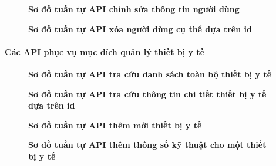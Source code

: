 \begin{figure}[H]
	\centering
	\caption[Sơ đồ tuần tự API chỉnh sửa thông tin người dùng]{\bfseries \fontsize{12pt}{0pt}\selectfont Sơ đồ tuần tự API chỉnh sửa thông tin người dùng}
	\label{sequence_diagram_update_user}
\end{figure}

\begin{figure}[H]
	\centering
	\caption[Sơ đồ tuần tự API xóa người dùng cụ thể dựa trên id]{\bfseries \fontsize{12pt}{0pt}\selectfont Sơ đồ tuần tự API xóa người dùng cụ thể dựa trên id}
	\label{sequence_diagram_delete_user}
\end{figure}

\paragraph{Các API phục vụ mục đích quản lý thiết bị y tế}
\begin{figure}[H]
	\centering
	\caption[Sơ đồ tuần tự API tra cứu danh sách toàn bộ thiết bị y tế]{\bfseries \fontsize{12pt}{0pt}\selectfont Sơ đồ tuần tự API tra cứu danh sách toàn bộ thiết bị y tế}
	\label{sequence_diagram_get_all_devices}
\end{figure}

\begin{figure}[H]
	\centering
	\caption[Sơ đồ tuần tự API tra cứu thông tin chi tiết thiết bị y tế dựa trên id]{\bfseries \fontsize{12pt}{0pt}\selectfont Sơ đồ tuần tự API tra cứu thông tin chi tiết thiết bị y tế dựa trên id}
	\label{sequence_diagram_get_device_by_id}
\end{figure}

\begin{figure}[H]
	\centering
	\caption[Sơ đồ tuần tự API thêm mới thiết bị y tế]{\bfseries \fontsize{12pt}{0pt}\selectfont Sơ đồ tuần tự API thêm mới thiết bị y tế}
	\label{sequence_diagram_add_device}
\end{figure}

\begin{figure}[H]
	\centering
	\caption[Sơ đồ tuần tự API thêm thông số kỹ thuật cho nột thiết bị y tế]{\bfseries \fontsize{12pt}{0pt}\selectfont Sơ đồ tuần tự API thêm thông số kỹ thuật cho một thiết bị y tế}
	\label{sequence_diagram_add_device}
\end{figure}

